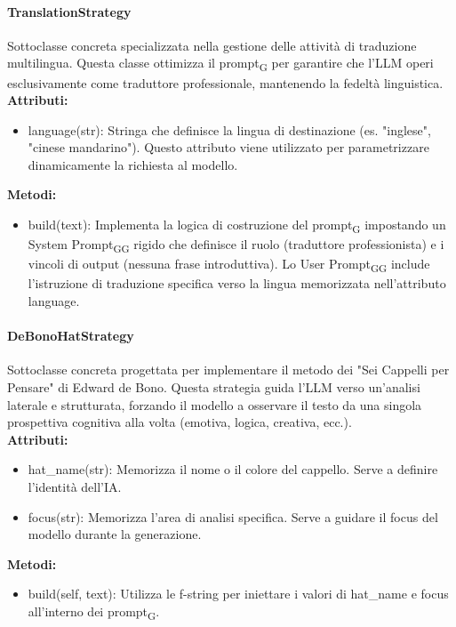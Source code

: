 \documentclass[11pt,a4paper]{article}
\newcommand{\gls}[1]{#1\textsubscript{G}}
\begin{document}
\paragraph{TranslationStrategy} 
Sottoclasse concreta specializzata nella gestione delle attività di traduzione multilingua. Questa classe ottimizza il \gls{prompt} per garantire che l'LLM operi esclusivamente come traduttore professionale, mantenendo la fedeltà linguistica.\\
\textbf{Attributi:}
\begin{itemize}
    \item language(str): Stringa che definisce la lingua di destinazione (es. "inglese", "cinese mandarino"). Questo attributo viene utilizzato per parametrizzare dinamicamente la richiesta al modello.
\end{itemize}
\textbf{Metodi:}
\begin{itemize}
    \item build(text): Implementa la logica di costruzione del \gls{prompt} impostando un \gls{System \gls{Prompt}} rigido che definisce il ruolo (traduttore professionista) e i vincoli di output (nessuna frase introduttiva). Lo \gls{User \gls{Prompt}} include l'istruzione di traduzione specifica verso la lingua memorizzata nell'attributo language.
\end{itemize}

\paragraph{DeBonoHatStrategy}
Sottoclasse concreta progettata per implementare il metodo dei "Sei Cappelli per Pensare" di Edward de Bono. Questa strategia guida l'LLM verso un'analisi laterale e strutturata, forzando il modello a osservare il testo da una singola prospettiva cognitiva alla volta (emotiva, logica, creativa, ecc.).\\
\textbf{Attributi:}
\begin{itemize}
    \item hat\_name(str): Memorizza il nome o il colore del cappello. Serve a definire l'identità dell'IA.
    \item focus(str): Memorizza l'area di analisi specifica. Serve a guidare il focus del modello durante la generazione.
\end{itemize}
\textbf{Metodi:}
\begin{itemize}
    \item build(self, text): Utilizza le f-string per iniettare i valori di hat\_name e focus all'interno dei \gls{prompt}.
\end{itemize}
\end{document}
